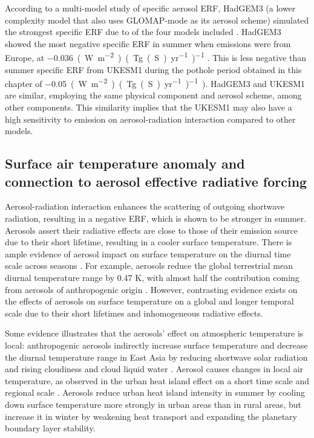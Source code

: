 According to a multi-model study of specific aerosol ERF, HadGEM3 (a lower complexity model that also uses GLOMAP-mode as its aerosol scheme) simulated the strongest specific ERF due to  of the four models included \citep{bellouinRegionalSeasonalRadiative2016}. HadGEM3 showed the most negative specific ERF in summer when emissions were from Europe, at \qty{-0.036}{(W~m^{-2})~(Tg(S)~yr^{-1})^{-1}} \citep{bellouinRegionalSeasonalRadiative2016}. This is less negative than summer specific ERF from UKESM1 during the pothole period obtained in this chapter of \qty{-0.05}{(W~m^{-2})~(Tg(S)~yr^{-1})^{-1})}. HadGEM3 and UKESM1 are similar, employing the same physical component and aerosol scheme, among other components. This similarity implies that the UKESM1 may also have a high sensitivity to  emission on aerosol-radiation interaction compared to other models.


\subsection{Surface air temperature anomaly and connection to aerosol effective radiative forcing}
\label{ch4:sec:seasonal-tas}

Aerosol-radiation interaction enhances the scattering of outgoing shortwave radiation, resulting in a negative ERF, which is shown to be stronger in summer. Aerosols assert their radiative effects are close to those of their emission source due to their short lifetime, resulting in a cooler surface temperature. There is ample evidence of aerosol impact on surface temperature on the diurnal time scale across seasons \citep[e.g. ][]{hanMechanismsSeasonalDifferences2020}. For example, aerosols reduce the global terrestrial mean diurnal temperature range by 0.47 K, with almost half the contribution coming from aerosols of anthropogenic origin \citep{chakrabortyLandCoverRegulates2019}. However, contrasting evidence exists on the effects of aerosols on surface temperature on a global and longer temporal scale due to their short lifetimes and inhomogeneous radiative effects. 

Some evidence illustrates that the aerosols' effect on atmospheric temperature is local: anthropogenic aerosols indirectly increase surface temperature and decrease the diurnal temperature range in East Asia by reducing shortwave solar radiation and rising cloudiness and cloud liquid water \citep{huangImpactAerosolIndirect2006}. Aerosol causes changes in local air temperature, as observed in the urban heat island effect on a short time scale and regional scale \citep{hanMechanismsSeasonalDifferences2020}. Aerosols reduce urban heat island intensity in summer by cooling down surface temperature more strongly in urban areas than in rural areas, but increase it in winter by weakening heat transport and expanding the planetary boundary layer stability. 


